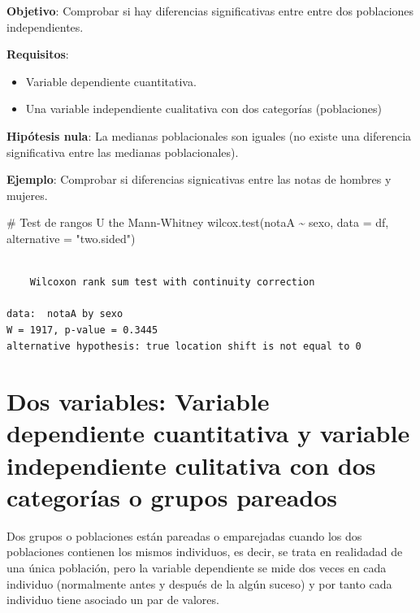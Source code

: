 \documentclass[
  a4paper,
]{scrreport}
\newenvironment{Shaded}{\begin{snugshade}}{\end{snugshade}}
\newcommand{\AttributeTok}[1]{\textcolor[rgb]{0.40,0.45,0.13}{#1}}
\newcommand{\CommentTok}[1]{\textcolor[rgb]{0.37,0.37,0.37}{#1}}
\newcommand{\FunctionTok}[1]{\textcolor[rgb]{0.28,0.35,0.67}{#1}}
\newcommand{\NormalTok}[1]{\textcolor[rgb]{0.00,0.23,0.31}{#1}}
\newcommand{\SpecialCharTok}[1]{\textcolor[rgb]{0.37,0.37,0.37}{#1}}
\newcommand{\StringTok}[1]{\textcolor[rgb]{0.13,0.47,0.30}{#1}}
\providecommand{\tightlist}{%
  \setlength{\itemsep}{0pt}\setlength{\parskip}{0pt}}\usepackage{longtable,booktabs,array}
\theoremstyle{definition}
\theoremstyle{definition}
\theoremstyle{remark}
\begin{document}
\textbf{Objetivo}: Comprobar si hay diferencias significativas entre
entre dos poblaciones independientes.

\textbf{Requisitos}:

\begin{itemize}
\tightlist
\item
  Variable dependiente cuantitativa.
\item
  Una variable independiente cualitativa con dos categorías
  (poblaciones)
\end{itemize}

\textbf{Hipótesis nula}: La medianas poblacionales son iguales (no
existe una diferencia significativa entre las medianas poblacionales).

\textbf{Ejemplo}: Comprobar si diferencias signicativas entre las notas
de hombres y mujeres.

\begin{Shaded}
\begin{Highlighting}[]
\CommentTok{\# Test de rangos U the Mann{-}Whitney}
\FunctionTok{wilcox.test}\NormalTok{(notaA }\SpecialCharTok{\textasciitilde{}}\NormalTok{ sexo, }\AttributeTok{data =}\NormalTok{ df, }\AttributeTok{alternative =} \StringTok{"two.sided"}\NormalTok{)}
\end{Highlighting}
\end{Shaded}

\begin{verbatim}

    Wilcoxon rank sum test with continuity correction

data:  notaA by sexo
W = 1917, p-value = 0.3445
alternative hypothesis: true location shift is not equal to 0
\end{verbatim}

\section{Dos variables: Variable dependiente cuantitativa y variable
independiente culitativa con dos categorías o grupos
pareados}\label{dos-variables-variable-dependiente-cuantitativa-y-variable-independiente-culitativa-con-dos-categoruxedas-o-grupos-pareados}

Dos grupos o poblaciones están pareadas o emparejadas cuando los dos
poblaciones contienen los mismos individuos, es decir, se trata en
realidadad de una única población, pero la variable dependiente se mide
dos veces en cada individuo (normalmente antes y después de la algún
suceso) y por tanto cada individuo tiene asociado un par de valores.
\end{document}
